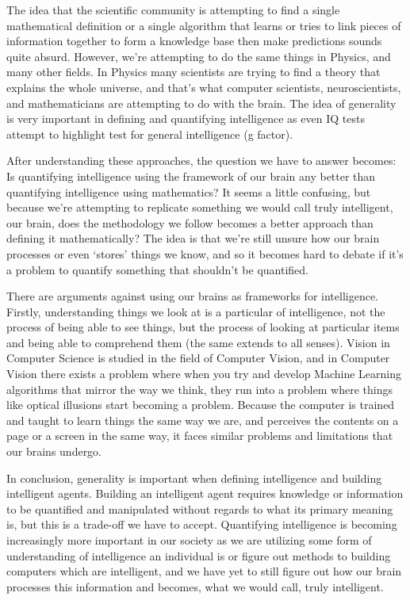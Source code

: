 \documentclass[11pt, oneside]{article}
\begin{document}
\par The idea that the scientific community is attempting to find a single mathematical definition or a single algorithm that learns or tries to link pieces of information together to form a knowledge base then make predictions sounds quite absurd. However, we're attempting to do the same things in Physics, and many other fields. In Physics many scientists are trying to find a theory that explains the whole universe, and that's what computer scientists, neuroscientists, and mathematicians are attempting to do with the brain. The idea of generality is very important in defining and quantifying intelligence as even IQ tests attempt to highlight test for general intelligence (g factor). 

\par After understanding these approaches, the question we have to answer becomes: Is quantifying intelligence using the framework of our brain any better than quantifying intelligence using mathematics? It seems a little confusing, but because we're attempting to replicate something we would call truly intelligent, our brain, does the methodology we follow becomes a better approach than defining it mathematically? The idea is that we're still unsure how our brain processes or even `stores' things we know, and so it becomes hard to debate if it's a problem to quantify something that shouldn't be quantified. 

\par There are arguments against using our brains as frameworks for intelligence. Firstly, understanding things we look at is a particular of intelligence, not the process of being able to see things, but the process of looking at particular items and being able to comprehend them (the same extends to all senses). Vision in Computer Science is studied in the field of Computer Vision, and in Computer Vision there exists a problem where when you try and develop Machine Learning algorithms that mirror the way we think, they run into a problem where things like optical illusions start becoming a problem. Because the computer is trained and taught to learn things the same way we are, and perceives the contents on a page or a screen in the same way, it faces similar problems and limitations that our brains undergo. 


\par In conclusion, generality is important when defining intelligence and building intelligent agents. Building an intelligent agent requires knowledge or information to be quantified and manipulated without regards to what its primary meaning is, but this is a trade-off we have to accept. Quantifying intelligence is becoming increasingly more important in our society as we are utilizing some form of understanding of intelligence an individual is or figure out methods to building computers which are intelligent, and we have yet to still figure out how our brain processes this information and becomes, what we would call, truly intelligent.
\end{document}
